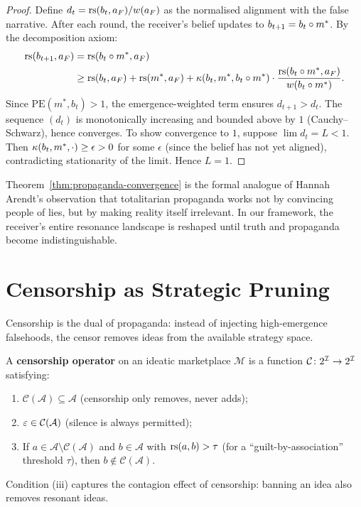 \begin{proof}
Define $d_t = \mathrm{rs}(b_t, a_F) / w(a_F)$ as the normalised alignment
with the false narrative.  After each round, the receiver's belief
updates to $b_{t+1} = b_t \circ m^*$.  By the decomposition axiom:
\begin{align*}
  \mathrm{rs}(b_{t+1}, a_F)
  &= \mathrm{rs}(b_t \circ m^*, a_F) \\
  &\ge \mathrm{rs}(b_t, a_F) + \mathrm{rs}(m^*, a_F)
    + \kappa(b_t, m^*, b_t \circ m^*) \cdot
      \frac{\mathrm{rs}(b_t \circ m^*, a_F)}{w(b_t \circ m^*)}.
\end{align*}
Since $\mathrm{PE}(m^*,b_t) > 1$, the emergence-weighted term
ensures $d_{t+1} > d_t$.  The sequence $(d_t)$ is monotonically
increasing and bounded above by $1$ (Cauchy--Schwarz), hence converges.
To show convergence to $1$, suppose $\lim d_t = L < 1$.  Then
$\kappa(b_t, m^*, \cdot) \ge \epsilon > 0$ for some $\epsilon$
(since the belief has not yet aligned), contradicting stationarity
of the limit.  Hence $L = 1$.
\end{proof}

\begin{remark}
Theorem~\ref{thm:propaganda-convergence} is the formal analogue of
Hannah Arendt's observation that totalitarian propaganda works not
by convincing people of lies, but by making reality itself irrelevant.
In our framework, the receiver's entire resonance landscape is
reshaped until truth and propaganda become indistinguishable.
\end{remark}

\section{Censorship as Strategic Pruning}
\label{sec:censorship}

Censorship is the dual of propaganda: instead of injecting
high-emergence falsehoods, the censor removes ideas from the
available strategy space.

\begin{definition}
\label{def:censorship}
A \textbf{censorship operator} on an ideatic marketplace
$\mathcal{M}$ is a function $\mathcal{C} \colon 2^{\mathcal{I}} \to 2^{\mathcal{I}}$
satisfying:
\begin{enumerate}[label=(\roman*)]
  \item $\mathcal{C}(\mathcal{A}) \subseteq \mathcal{A}$ (censorship
    only removes, never adds);
  \item $\varepsilon \in \mathcal{C}(\mathcal{A})$ (silence is always
    permitted);
  \item If $a \in \mathcal{A} \setminus \mathcal{C}(\mathcal{A})$
    and $b \in \mathcal{A}$ with $\mathrm{rs}(a,b) > \tau$ (for a
    ``guilt-by-association'' threshold $\tau$), then
    $b \notin \mathcal{C}(\mathcal{A})$.
\end{enumerate}
Condition (iii) captures the contagion effect of censorship:
banning an idea also removes resonant ideas.
\end{definition}

